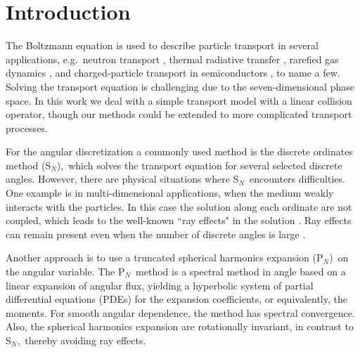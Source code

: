 \documentclass[review]{elsarticle}
\newcommand{\pn}{P$_N$}
\newcommand{\sn}{S$_N$}
\begin{document}
\section{Introduction}
The Boltzmann equation is used to describe particle transport in several applications, e.g.\ neutron transport \cite{glasstone}, thermal radiative transfer \cite{pomraning1973equations}, rarefied gas dynamics \cite{Grad:1949wi}, and charged-particle transport in semiconductors \cite{markowich2012semiconductor}, to name a few. Solving the transport equation is challenging due to the seven-dimensional phase space. In this work we deal with a simple transport model with a linear collision operator, though our methods could be extended to more complicated transport processes. 

For the angular discretization a commonly used method is the discrete ordinates method (\sn),\ which solves the transport equation for several selected discrete angles. However, there are physical situations where \sn\ encounters difficulties. One example is in multi-dimensional applications, when the medium weakly interacts with the particles. In this case the solution along each ordinate are not coupled, which leads to the well-known ``ray effects" in the solution \cite{Mathews:1999uv}. Ray effects can remain present even when the number of discrete angles is large \cite{Morel:2003vt}. %

Another approach is to use a truncated spherical harmonics expansion (\pn)\ on the angular variable. The \pn~method is a spectral method in angle based on a linear expansion of angular flux, yielding a hyperbolic system of partial differential equations (PDEs) for the expansion coefficients, or equivalently, the moments. For smooth angular dependence, the method has spectral convergence. Also, the spherical harmonics expansion are rotationally invariant, in contrast to \sn,\ thereby avoiding ray effects.
\end{document}
